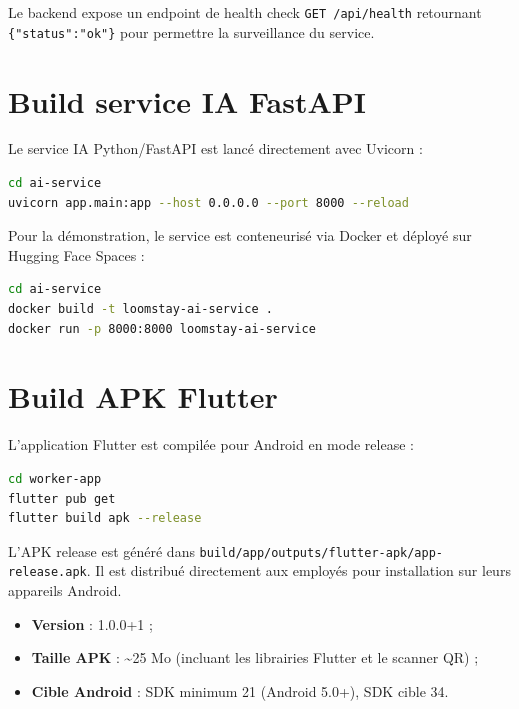 Le backend expose un endpoint de health check \texttt{GET /api/health} retournant \texttt{\{"status":"ok"\}} pour permettre la surveillance du service.

\section{Build service IA FastAPI}
\label{sec:build_ia}

Le service IA Python/FastAPI est lancé directement avec Uvicorn :

\begin{lstlisting}[language=bash, caption={Lancement du service IA — développement}]
cd ai-service
uvicorn app.main:app --host 0.0.0.0 --port 8000 --reload
\end{lstlisting}

Pour la démonstration, le service est conteneurisé via Docker et déployé sur Hugging Face Spaces :

\begin{lstlisting}[language=bash, caption={Build Docker — Service IA}]
cd ai-service
docker build -t loomstay-ai-service .
docker run -p 8000:8000 loomstay-ai-service
\end{lstlisting}


\section{Build APK Flutter}
\label{sec:build_apk}

L'application Flutter est compilée pour Android en mode release :

\begin{lstlisting}[language=bash, caption={Build APK release — Application Flutter worker}]
cd worker-app
flutter pub get
flutter build apk --release
\end{lstlisting}

L'APK release est généré dans \texttt{build/app/outputs/flutter-apk/app-release.apk}. Il est distribué directement aux employés pour installation sur leurs appareils Android.

\begin{itemize}
  \item \textbf{Version} : 1.0.0+1 ;
  \item \textbf{Taille APK} : \textasciitilde{}25 Mo (incluant les librairies Flutter et le scanner QR) ;
  \item \textbf{Cible Android} : SDK minimum 21 (Android 5.0+), SDK cible 34.
\end{itemize}

